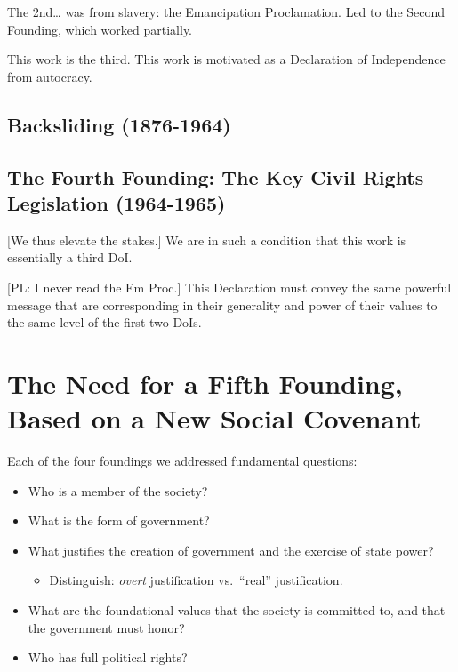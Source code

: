 \documentclass[
]{book}
\providecommand{\tightlist}{%
  \setlength{\itemsep}{0pt}\setlength{\parskip}{0pt}}
\begin{document}
The 2nd\ldots{} was from slavery: the Emancipation Proclamation. Led to the Second Founding, which worked partially.

This work is the third. This work is motivated as a Declaration of Independence from autocracy.

\hypertarget{backsliding-1876-1964}{%
\subsection{Backsliding (1876-1964)}\label{backsliding-1876-1964}}

\hypertarget{the-fourth-founding-the-key-civil-rights-legislation-1964-1965}{%
\subsection{The Fourth Founding: The Key Civil Rights Legislation (1964-1965)}\label{the-fourth-founding-the-key-civil-rights-legislation-1964-1965}}

{[}We thus elevate the stakes.{]} We are in such a condition that this work is essentially a third DoI.

{[}PL: I never read the Em Proc.{]} This Declaration must convey the same powerful message that are corresponding in their generality and power of their values to the same level of the first two DoIs.

\hypertarget{the-need-for-a-fifth-founding-based-on-a-new-social-covenant}{%
\section{The Need for a Fifth Founding, Based on a New Social Covenant}\label{the-need-for-a-fifth-founding-based-on-a-new-social-covenant}}

Each of the four foundings we addressed fundamental questions:

\begin{itemize}
\tightlist
\item
  Who is a member of the society?
\item
  What is the form of government?
\item
  What justifies the creation of government and the exercise of state power?

  \begin{itemize}
  \tightlist
  \item
    Distinguish: \emph{overt} justification vs.~``real'' justification.
  \end{itemize}
\item
  What are the foundational values that the society is committed to, and that the government must honor?
\item
  Who has full political rights?
\end{itemize}
\end{document}
